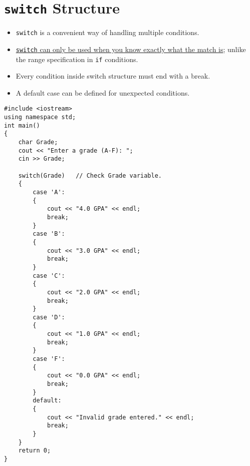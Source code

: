 \documentclass[12pt,a4paper]{article}
\begin{document}
\section{\texttt{switch} Structure}
\begin{itemize}
\item \verb|switch| is a convenient way of handling multiple conditions.
\item \underline{\texttt{switch} can only be used when you know exactly what the match is}; unlike the range specification in \verb|if| conditions.
\item Every condition inside switch structure must end with a break.
\item A default case can be defined for unexpected conditions.
\end{itemize}
\begin{lstlisting}[caption={Using switch to Display GPA}]
#include <iostream>
using namespace std;
int main()
{
	char Grade;
	cout << "Enter a grade (A-F): ";
	cin >> Grade;
	
	switch(Grade)	// Check Grade variable.
	{
		case 'A':
		{
			cout << "4.0 GPA" << endl;
			break;
		}
		case 'B':
		{
			cout << "3.0 GPA" << endl;
			break;
		}
		case 'C':
		{
			cout << "2.0 GPA" << endl;
			break;
		}
		case 'D':
		{
			cout << "1.0 GPA" << endl;
			break;
		}
		case 'F':
		{
			cout << "0.0 GPA" << endl;
			break;
		}
		default:
		{
			cout << "Invalid grade entered." << endl;
			break;
		}
	}	
	return 0;
}
\end{lstlisting}
\end{document}
